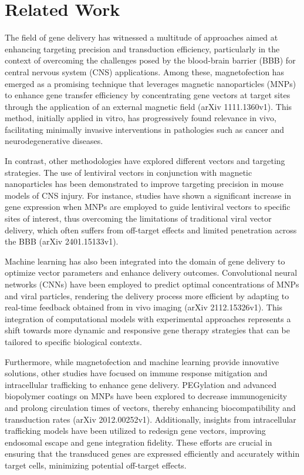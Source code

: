 \documentclass{article}
\begin{document}
\section{Related Work}
The field of gene delivery has witnessed a multitude of approaches aimed at enhancing targeting precision and transduction efficiency, particularly in the context of overcoming the challenges posed by the blood-brain barrier (BBB) for central nervous system (CNS) applications. Among these, magnetofection has emerged as a promising technique that leverages magnetic nanoparticles (MNPs) to enhance gene transfer efficiency by concentrating gene vectors at target sites through the application of an external magnetic field (arXiv 1111.1360v1). This method, initially applied in vitro, has progressively found relevance in vivo, facilitating minimally invasive interventions in pathologies such as cancer and neurodegenerative diseases.

In contrast, other methodologies have explored different vectors and targeting strategies. The use of lentiviral vectors in conjunction with magnetic nanoparticles has been demonstrated to improve targeting precision in mouse models of CNS injury. For instance, studies have shown a significant increase in gene expression when MNPs are employed to guide lentiviral vectors to specific sites of interest, thus overcoming the limitations of traditional viral vector delivery, which often suffers from off-target effects and limited penetration across the BBB (arXiv 2401.15133v1).

Machine learning has also been integrated into the domain of gene delivery to optimize vector parameters and enhance delivery outcomes. Convolutional neural networks (CNNs) have been employed to predict optimal concentrations of MNPs and viral particles, rendering the delivery process more efficient by adapting to real-time feedback obtained from in vivo imaging (arXiv 2112.15326v1). This integration of computational models with experimental approaches represents a shift towards more dynamic and responsive gene therapy strategies that can be tailored to specific biological contexts.

Furthermore, while magnetofection and machine learning provide innovative solutions, other studies have focused on immune response mitigation and intracellular trafficking to enhance gene delivery. PEGylation and advanced biopolymer coatings on MNPs have been explored to decrease immunogenicity and prolong circulation times of vectors, thereby enhancing biocompatibility and transduction rates (arXiv 2012.00252v1). Additionally, insights from intracellular trafficking models have been utilized to redesign gene vectors, improving endosomal escape and gene integration fidelity. These efforts are crucial in ensuring that the transduced genes are expressed efficiently and accurately within target cells, minimizing potential off-target effects.
\end{document}
